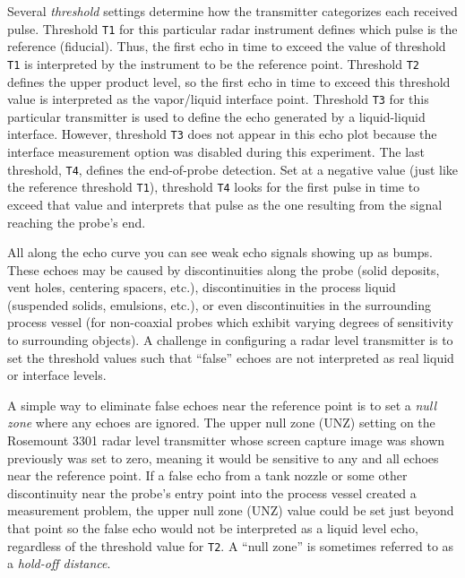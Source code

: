 Several \textit{threshold} settings determine how the transmitter categorizes each received pulse.  Threshold \texttt{T1} for this particular radar instrument defines which pulse is the reference (fiducial).  Thus, the first echo in time to exceed the value of threshold \texttt{T1} is interpreted by the instrument to be the reference point.  Threshold \texttt{T2} defines the upper product level, so the first echo in time to exceed this threshold value is interpreted as the vapor/liquid interface point.  Threshold \texttt{T3} for this particular transmitter is used to define the echo generated by a liquid-liquid interface.  However, threshold \texttt{T3} does not appear in this echo plot because the interface measurement option was disabled during this experiment.  The last threshold, \texttt{T4}, defines the end-of-probe detection.  Set at a negative value (just like the reference threshold \texttt{T1}), threshold \texttt{T4} looks for the first pulse in time to exceed that value and interprets that pulse as the one resulting from the signal reaching the probe's end.

All along the echo curve you can see weak echo signals showing up as bumps.  These echoes may be caused by discontinuities along the probe (solid deposits, vent holes, centering spacers, etc.), discontinuities in the process liquid (suspended solids, emulsions, etc.), or even discontinuities in the surrounding process vessel (for non-coaxial probes which exhibit varying degrees of sensitivity to surrounding objects).  A challenge in configuring a radar level transmitter is to set the threshold values such that ``false'' echoes are not interpreted as real liquid or interface levels.

A simple way to eliminate false echoes near the reference point is to set a \textit{null zone} where any echoes are ignored.  The upper null zone (UNZ) setting on the Rosemount 3301 radar level transmitter whose screen capture image was shown previously was set to zero, meaning it would be sensitive to any and all echoes near the reference point.  If a false echo from a tank nozzle or some other discontinuity near the probe's entry point into the process vessel created a measurement problem, the upper null zone (UNZ) value could be set just beyond that point so the false echo would not be interpreted as a liquid level echo, regardless of the threshold value for \texttt{T2}.  A ``null zone'' is sometimes referred to as a \textit{hold-off distance}.    


